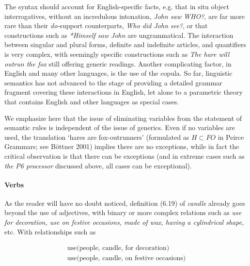 The syntax should account for English-specific facts, e.g. that in situ object
interrogatives, without an incredulous intonation, {\it John saw WHO?}, are
far more rare than their {\it do-}support 
counterparts, {\it Who did John see?}, or that constructions such as {\it
  *Himself saw John} are ungrammatical.  The interaction between singular and
plural forms, definite and indefinite articles, and quantifiers is very
complex, with seemingly specific constructions such as {\it The hare will
  outrun the fox} still offering generic readings.  Another complicating
factor, in English and many other languages, is the use of the copula. So far,
linguistic semantics has not advanced to the stage of providing a detailed
grammar fragment covering these interactions in English, let alone to a
parametric theory that contains English and other languages as special cases.

We emphasize here that the issue of eliminating variables from the statement
of semantic rules is independent of the issue of generics. Even if no
variables are used, the translation `hares are fox-outrunners' (formulated as
$H \subset FO$ in Peirce Grammars; see B\"ottner 2001)\nocite{Bo2ttner:2001}
implies there are no exceptions, while in fact the critical observation is
that there can be exceptions (and in extreme cases such as {\it the P6
  processor} discussed above, all cases can be exceptional).

\paragraph{Verbs} As the reader will have no doubt noticed, definition (6.19)
of {\it candle} already goes beyond the use of adjectives, with binary or more
complex relations such as {\it use for decoration, use on festive occasions,
  made of wax, having a cylindrical shape}, etc. With relationships such as

\begin{eqnarray}
\text{use(people, candle, for decoration)}\\
\text{use(people, candle, on festive occasions)}
\end{eqnarray}

